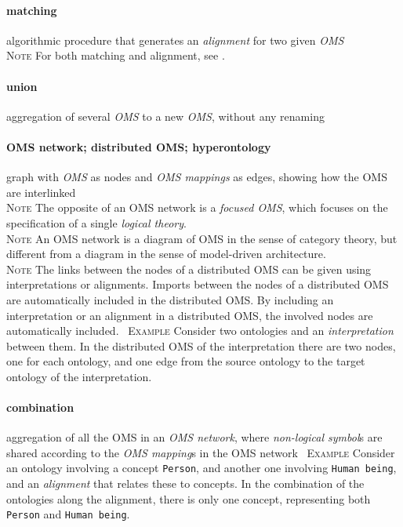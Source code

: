 \documentclass[10pt,%
\ifpretendfinal
final%
\else
draft%
\fi,
]{scrreprt}
\newcommand*{\termref}[1]{\textit{#1}}
\newcommand*{\synonym}{; }
\newcommand{\termdefinition}[2]{\paragraph{#1} #2}
\newenvironment{definitions}[0]{\medskip }{}
\newenvironment{note}[0]{\ \\ \textsc{Note} \quad}{}
\newenvironment{example}[0]{\ \newline \textsc{Example}\quad }{}
\newcommand{\red}[1]{{\color{red}{#1}}}
\begin{document}
\begin{definitions}
  \termdefinition{matching}{algorithmic procedure that generates an \termref{alignment} for two given \termref{OMS}}
  \begin{note}
    For both matching and alignment, see \cite{DBLP:books/daglib/0032976,KhanKeet13}.
  \end{note}

  \termdefinition{union}{aggregation of several \termref{OMS}
    to a new \termref{OMS}, without any renaming}
\ednote{\red{why is this here?}}
 
\termdefinition{OMS network\synonym distributed OMS\synonym hyperontology} graph with \termref{OMS} as nodes and \termref{OMS mappings} as edges, showing how the OMS are interlinked
\begin{note}
 The opposite of an OMS network is a \termref{focused OMS}, which
 focuses on the specification of a single \termref{logical theory}.
\end{note}
  \begin{note}
    An OMS network is a diagram of OMS in the sense of category theory, but different from a diagram
    in the sense of model-driven architecture.
  \end{note}
 \begin{note}
   The links between the nodes of a distributed OMS can be given using interpretations or alignments. Imports between the nodes
   of a  distributed OMS are automatically included in the distributed OMS. By including an interpretation or an alignment in a distributed 
   OMS, the involved nodes are automatically included.
 \end{note}
 \begin{example}
 Consider two ontologies and an \termref{interpretation} between them.  In the distributed OMS of the interpretation there are 
  two nodes, one for each ontology, and one edge from the source ontology to the target ontology of the interpretation. 
 \end{example}



  \termdefinition{combination}{aggregation of all the OMS in an \termref{OMS network}, where \termref{non-logical symbol}s are shared according to the \termref{OMS mapping}s in the OMS network}
\begin{example}
Consider an ontology involving a concept \texttt{Person},
and another one involving \texttt{Human being}, and an \termref{alignment}
that relates these to concepts. In the combination of the ontologies
along the alignment, there is only one concept, representing both
\texttt{Person} and \texttt{Human being}.
\end{example}


\end{definitions}
\end{document}
